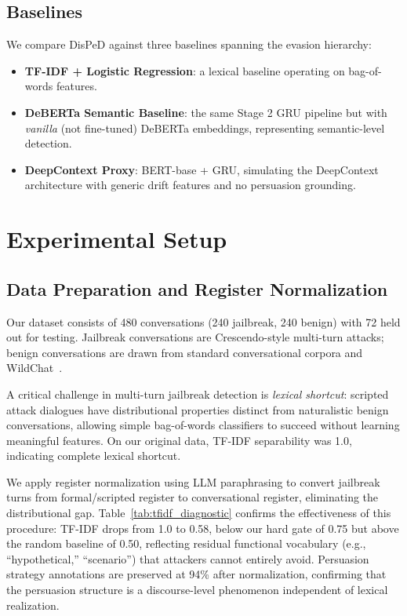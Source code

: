 \documentclass[11pt,a4paper]{article}
\begin{document}
\subsection{Baselines}

We compare DisPeD against three baselines spanning the evasion hierarchy:
\begin{itemize}
    \item \textbf{TF-IDF + Logistic Regression}: a lexical baseline operating on bag-of-words features.
    \item \textbf{DeBERTa Semantic Baseline}: the same Stage 2 GRU pipeline but with \emph{vanilla} (not fine-tuned) DeBERTa embeddings, representing semantic-level detection.
    \item \textbf{DeepContext Proxy}: BERT-base + GRU, simulating the DeepContext architecture with generic drift features and no persuasion grounding.
\end{itemize}

\section{Experimental Setup}
\label{sec:setup}

\subsection{Data Preparation and Register Normalization}
\label{sec:data}

Our dataset consists of 480 conversations (240 jailbreak, 240 benign) with 72 held out for testing. Jailbreak conversations are Crescendo-style multi-turn attacks; benign conversations are drawn from standard conversational corpora and WildChat~\citep{zhao2024wildchat}.

A critical challenge in multi-turn jailbreak detection is \emph{lexical shortcut}: scripted attack dialogues have distributional properties distinct from naturalistic benign conversations, allowing simple bag-of-words classifiers to succeed without learning meaningful features. On our original data, TF-IDF separability was 1.0, indicating complete lexical shortcut.

We apply register normalization using LLM paraphrasing to convert jailbreak turns from formal/scripted register to conversational register, eliminating the distributional gap. Table~\ref{tab:tfidf_diagnostic} confirms the effectiveness of this procedure: TF-IDF drops from 1.0 to 0.58, below our hard gate of 0.75 but above the random baseline of 0.50, reflecting residual functional vocabulary (e.g., ``hypothetical,'' ``scenario'') that attackers cannot entirely avoid. Persuasion strategy annotations are preserved at 94\% after normalization, confirming that the persuasion structure is a discourse-level phenomenon independent of lexical realization.
\end{document}
